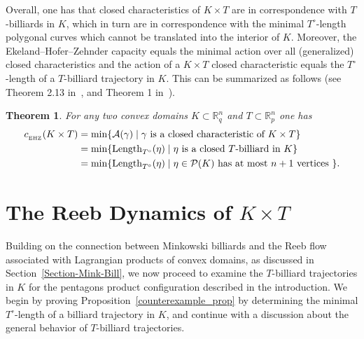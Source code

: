 \documentclass[10pt,a4paper]{article}
\newtheorem{theorem}{Theorem}[section]
\theoremstyle{definition}
\newcommand{\ehzcap}{c_{_{\rm EHZ}}}
\begin{document}
\medskip













Overall, one has that closed characteristics of $K \times T$ are in correspondence with $T$-billiards in $K$, which in turn are in correspondence with the minimal $T^\circ$-length polygonal curves which cannot be translated into the interior of $K$.
Moreover, the Ekeland--Hofer--Zehnder capacity equals the minimal action over all (generalized) closed characteristics and the action of a $K \times T$ closed characteristic equals the $T^\circ$-length of a $T$-billiard trajectory in $K$. This can be summarized as follows (see Theorem 2.13 in~\cite{AA-O},
and Theorem 1 in~\cite{Mink-Bill-Rudolf}). 

\begin{theorem} \label{thm-capacity-lagrangian-product}
For any two convex domains $K \subset {\mathbb R}^n_q$ and $T \subset {\mathbb R}^n_p$ one has
\begin{align*}
    \ehzcap(K \times T) &= \min\{\mathcal{A}(\gamma) \mid \gamma \text{ is a closed characteristic of } K \times T\}\\
    &= \min\{ {\rm Length}_{T^\circ}(\eta) \mid \eta\text{ is a closed } T\text{-billiard in } K\}\\
    &= \min\{ {\rm Length}_{T^\circ}(\eta) \mid \eta  \in \mathcal{P}(K)\text{ has at most } n+1\text{ vertices } \}.
\end{align*}
\end{theorem}

\section{The Reeb Dynamics of $K \times T$}

Building on the connection between Minkowski billiards and the Reeb flow associated with Lagrangian products of convex domains, as discussed in Section~\ref{Section-Mink-Bill}, we now proceed to examine the \( T \)-billiard trajectories in \( K \) for the pentagons product configuration described in the introduction.  
We begin by proving Proposition~\ref{counterexample_prop} by determining the minimal \( T^\circ \)-length of a billiard trajectory in \( K \), and continue with a discussion about the general behavior of $T$-billiard trajectories.
\end{document}
